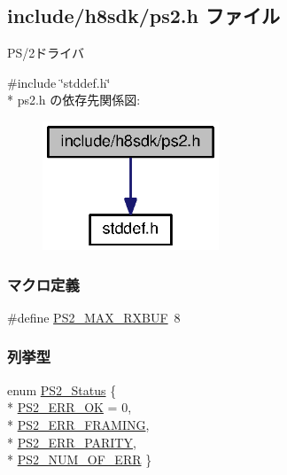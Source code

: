 \subsection{include/h8sdk/ps2.h ファイル}
\label{ps2_8h}


P\+S/2ドライバ  


{\ttfamily \#include \char`\"{}stddef.\+h\char`\"{}}\\*
ps2.\+h の依存先関係図\+:
\nopagebreak
\begin{figure}[H]
\begin{center}
\leavevmode
\includegraphics[width=149pt]{d0/d3c/ps2_8h__incl}
\end{center}
\end{figure}
\subsubsection*{マクロ定義}
\begin{DoxyCompactItemize}
\item 
\#define \hyperlink{ps2_8h_a2cd015df52183305c4a3e91f6f35d087_a2cd015df52183305c4a3e91f6f35d087}{P\+S2\+\_\+\+M\+A\+X\+\_\+\+R\+X\+B\+U\+F}~8
\end{DoxyCompactItemize}
\subsubsection*{列挙型}
\begin{DoxyCompactItemize}
\item 
enum \hyperlink{ps2_8h_af69f908bec8e74d387cd5510dff2c1a3_af69f908bec8e74d387cd5510dff2c1a3}{P\+S2\+\_\+\+Status} \{ \\*
\hyperlink{ps2_8h_af69f908bec8e74d387cd5510dff2c1a3_af69f908bec8e74d387cd5510dff2c1a3a399bd01192694d2fec00800befc6fb1e}{P\+S2\+\_\+\+E\+R\+R\+\_\+\+O\+K} = 0, 
\\*
\hyperlink{ps2_8h_af69f908bec8e74d387cd5510dff2c1a3_af69f908bec8e74d387cd5510dff2c1a3a40cb92a14d84f9f4bc7e72c8b47812de}{P\+S2\+\_\+\+E\+R\+R\+\_\+\+F\+R\+A\+M\+I\+N\+G}, 
\\*
\hyperlink{ps2_8h_af69f908bec8e74d387cd5510dff2c1a3_af69f908bec8e74d387cd5510dff2c1a3a3e134d9dd2d1cb5ed15561562ee253aa}{P\+S2\+\_\+\+E\+R\+R\+\_\+\+P\+A\+R\+I\+T\+Y}, 
\\*
\hyperlink{ps2_8h_af69f908bec8e74d387cd5510dff2c1a3_af69f908bec8e74d387cd5510dff2c1a3a5f8a9e26ea7405a27014a1465432fdde}{P\+S2\+\_\+\+N\+U\+M\+\_\+\+O\+F\+\_\+\+E\+R\+R}
 \}
\end{DoxyCompactItemize}
